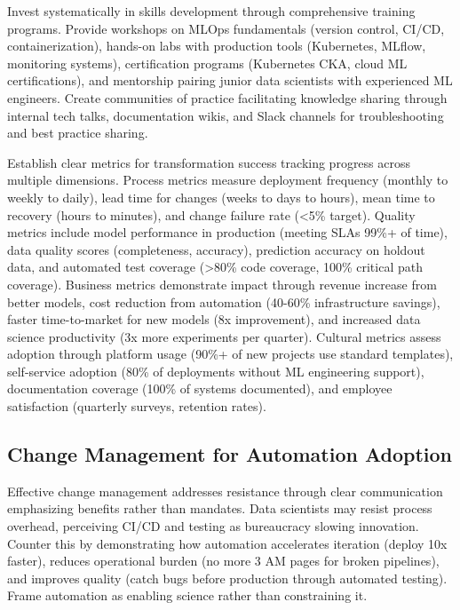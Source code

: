 Invest systematically in skills development through comprehensive training programs. Provide workshops on MLOps fundamentals (version control, CI/CD, containerization), hands-on labs with production tools (Kubernetes, MLflow, monitoring systems), certification programs (Kubernetes CKA, cloud ML certifications), and mentorship pairing junior data scientists with experienced ML engineers. Create communities of practice facilitating knowledge sharing through internal tech talks, documentation wikis, and Slack channels for troubleshooting and best practice sharing.

Establish clear metrics for transformation success tracking progress across multiple dimensions. Process metrics measure deployment frequency (monthly to weekly to daily), lead time for changes (weeks to days to hours), mean time to recovery (hours to minutes), and change failure rate (<5\% target). Quality metrics include model performance in production (meeting SLAs 99\%+ of time), data quality scores (completeness, accuracy), prediction accuracy on holdout data, and automated test coverage (>80\% code coverage, 100\% critical path coverage). Business metrics demonstrate impact through revenue increase from better models, cost reduction from automation (40-60\% infrastructure savings), faster time-to-market for new models (8x improvement), and increased data science productivity (3x more experiments per quarter). Cultural metrics assess adoption through platform usage (90\%+ of new projects use standard templates), self-service adoption (80\% of deployments without ML engineering support), documentation coverage (100\% of systems documented), and employee satisfaction (quarterly surveys, retention rates).

\subsection{Change Management for Automation Adoption}

Effective change management addresses resistance through clear communication emphasizing benefits rather than mandates. Data scientists may resist process overhead, perceiving CI/CD and testing as bureaucracy slowing innovation. Counter this by demonstrating how automation accelerates iteration (deploy 10x faster), reduces operational burden (no more 3 AM pages for broken pipelines), and improves quality (catch bugs before production through automated testing). Frame automation as enabling science rather than constraining it.

